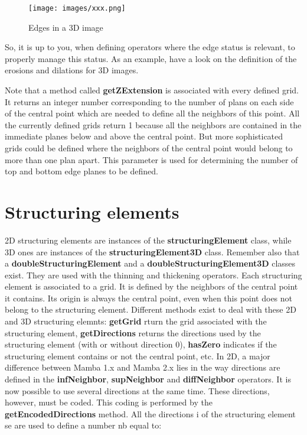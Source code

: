\documentclass[a4paper,10pt,oneside]{article}
\begin{document}
\begin{figure}
\centering
\texttt{[image: images/xxx.png]}
\caption{Edges in a 3D image}
\label{fig:3D_edges}
\end{figure}

So, it is up to you, when defining operators where the edge status is relevant, to properly manage this status. As an example, have a look on the
definition of the erosions and dilations for 3D images.

Note that a method called \textbf{getZExtension} is associated with every defined grid. It returns an integer number corresponding to
the number of plans on each side of the central point which are needed to define all the neighbors of this point. All the currently
defined grids return 1 because all the neighbors are contained in the immediate planes below and above the central point. But more
sophisticated grids could be defined where the neighbors of the central point would belong to more than one plan apart. This parameter is
used for determining the number of top and bottom edge planes to be defined.
 
\section{Structuring elements}
\label{cha:structelem}
2D structuring elements are instances of the \textbf{structuringElement} class, while 3D ones are instances of the \textbf{structuringElement3D}
class. Remember also that a \textbf{doubleStructuringElement} and a \textbf{doubleStructuringElement3D} classes exist. They are used with
the thinning and thickening operators.
Each structuring element is associated to a grid. It is defined by the neighbors of the central point it contains. Its origin is always
the central point, even when this point does not belong to the structuring element. Different methods exist to deal with these 2D and
3D structuring elemnts: \textbf{getGrid} rturn the grid associated with the structuring element, \textbf{getDirections} returns the
directions used by the structuring element (with or without direction 0), \textbf{hasZero} indicates if the structuring element contains
or not the central point, etc.
In 2D, a major difference between Mamba 1.x and Mamba 2.x lies in the way directions are defined in the \textbf{infNeighbor}, \textbf{supNeighbor}
and \textbf{diffNeighbor} operators. It is now possible to use several directions at the same time. These directions, however, must be coded.
This coding is performed by the \textbf{getEncodedDirections} method. All the directions i of the structuring element se are used to define a
number nb equal to:
\end{document}
